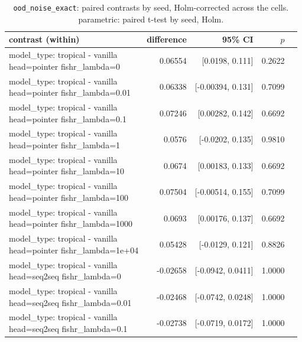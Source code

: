 \documentclass[10pt]{article}
\makeatletter
\newcommand{\stackcell}[1]{\begin{tabular}[t]{@{}l@{}}#1\end{tabular}}
\makeatother
\begin{document}
{\small
\begin{longtable}{lrrrl}
\caption{\texttt{ood\_noise\_exact}: paired contrasts by seed, Holm-corrected across the cells. parametric: paired t-test by seed, Holm.}\label{tab:paired-ood_noise_exact}\\
\toprule
contrast (within) & difference & 95\% CI & $p$ & \\
\midrule
\endhead
\stackcell{model\_type: tropical - vanilla\\\footnotesize head=pointer fishr\_lambda=0 } & 0.06554 & [0.0198, 0.111] & 0.2622 & \\
\stackcell{model\_type: tropical - vanilla\\\footnotesize head=pointer fishr\_lambda=0.01 } & 0.06338 & [-0.00394, 0.131] & 0.7099 & \\
\stackcell{model\_type: tropical - vanilla\\\footnotesize head=pointer fishr\_lambda=0.1 } & 0.07246 & [0.00282, 0.142] & 0.6692 & \\
\stackcell{model\_type: tropical - vanilla\\\footnotesize head=pointer fishr\_lambda=1 } & 0.0576 & [-0.0202, 0.135] & 0.9810 & \\
\stackcell{model\_type: tropical - vanilla\\\footnotesize head=pointer fishr\_lambda=10 } & 0.0674 & [0.00183, 0.133] & 0.6692 & \\
\stackcell{model\_type: tropical - vanilla\\\footnotesize head=pointer fishr\_lambda=100 } & 0.07504 & [-0.00514, 0.155] & 0.7099 & \\
\stackcell{model\_type: tropical - vanilla\\\footnotesize head=pointer fishr\_lambda=1000 } & 0.0693 & [0.00176, 0.137] & 0.6692 & \\
\stackcell{model\_type: tropical - vanilla\\\footnotesize head=pointer fishr\_lambda=1e+04 } & 0.05428 & [-0.0129, 0.121] & 0.8826 & \\
\stackcell{model\_type: tropical - vanilla\\\footnotesize head=seq2seq fishr\_lambda=0 } & -0.02658 & [-0.0942, 0.0411] & 1.0000 & \\
\stackcell{model\_type: tropical - vanilla\\\footnotesize head=seq2seq fishr\_lambda=0.01 } & -0.02468 & [-0.0742, 0.0248] & 1.0000 & \\
\stackcell{model\_type: tropical - vanilla\\\footnotesize head=seq2seq fishr\_lambda=0.1 } & -0.02738 & [-0.0719, 0.0172] & 1.0000 & \\

\end{longtable}}
\end{document}
